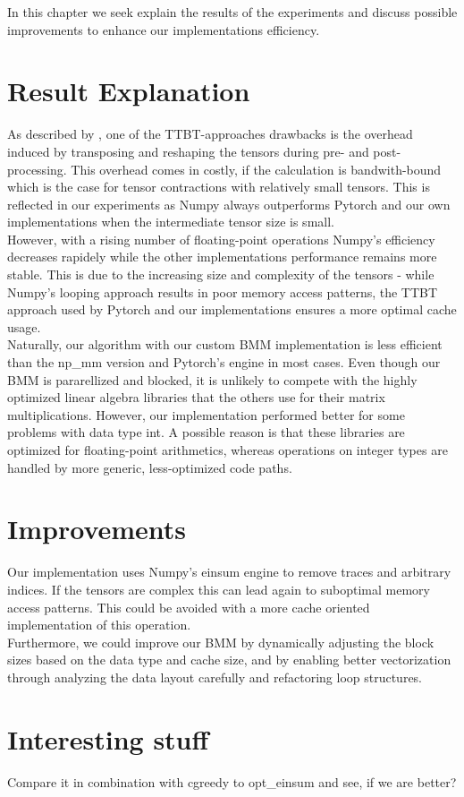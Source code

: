 In this chapter we seek explain the results of the experiments and discuss possible improvements to enhance our implementations efficiency.\\

\section{Result Explanation}
As described by \textcite{springer}, one of the TTBT-approaches drawbacks is the overhead induced by transposing and reshaping the tensors during pre- and post-processing. This overhead comes in costly, if the calculation is bandwith-bound which is the case for tensor contractions with relatively small tensors. This is reflected in our experiments as Numpy always outperforms Pytorch and our own implementations when the intermediate tensor size is small.\\
However, with a rising number of floating-point operations Numpy's efficiency decreases rapidely while the other implementations performance remains more stable. 
This is due to the increasing size and complexity of the tensors - while Numpy's looping approach results in poor memory access patterns, the TTBT approach used by Pytorch and our implementations ensures a more optimal cache usage.\\

\noindent Naturally, our algorithm with our custom BMM implementation is less efficient than the np\_mm version and Pytorch's engine in most cases. Even though our BMM is pararellized and blocked, it is unlikely to compete with the highly optimized linear algebra libraries that the others use for their matrix multiplications. However, our implementation performed better for some problems with data type int. A possible reason is that these libraries are optimized for floating-point arithmetics, whereas operations on integer types are handled by more generic, less-optimized code paths.\\

\section{Improvements}
Our implementation uses Numpy's einsum engine to remove traces and arbitrary indices. If the tensors are complex this can lead again to suboptimal memory access patterns. This could be avoided with a more cache oriented implementation of this operation.\\
Furthermore, we could improve our BMM by dynamically adjusting the block sizes based on the data type and cache size, and by enabling better vectorization through analyzing the data layout carefully and refactoring loop structures.

\section{Interesting stuff}
Compare it in combination with cgreedy to opt\_einsum and see, if we are better?
